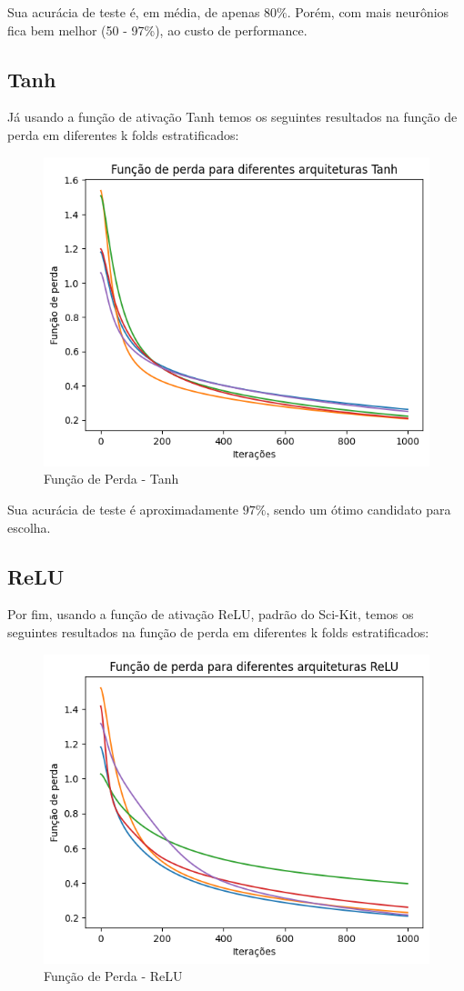\documentclass{article}
\begin{document}
Sua acurácia de teste é, em média, de apenas $80\%$. Porém, com mais neurônios fica bem melhor (50 - 97\%), ao custo de performance.

\subsection{Tanh}

Já usando a função de ativação Tanh temos os seguintes resultados na função de perda em diferentes k folds estratificados:

\begin{figure}[ht!]
    \centering
    \includegraphics[width=0.5\linewidth]{tanh_loss.png}
    \caption{Função de Perda - Tanh}
    \label{fig:enter-label}
\end{figure}

Sua acurácia de teste é aproximadamente $97\%$, sendo um ótimo candidato para escolha.

\subsection{ReLU}

Por fim, usando a função de ativação ReLU, padrão do Sci-Kit, temos os seguintes resultados na função de perda em diferentes k folds estratificados:

\begin{figure}[ht!]
    \centering
    \includegraphics[width=0.5\linewidth]{relu_loss.png}
    \caption{Função de Perda - ReLU}
    \label{fig:enter-label}
\end{figure}
\end{document}
